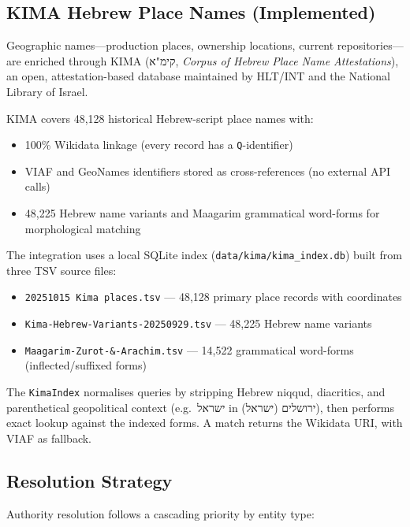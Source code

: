 \documentclass[12pt]{article}
\newcommand{\filepath}[1]{\texttt{\small #1}}
\newcommand{\code}[1]{\texttt{#1}}
\begin{document}
\subsection{KIMA Hebrew Place Names (Implemented)}

Geographic names---production places, ownership locations, current repositories---are enriched through KIMA (\texthebrew{קימ"א}, \emph{Corpus of Hebrew Place Name Attestations}), an open, attestation-based database maintained by HLT/INT and the National Library of Israel.

KIMA covers 48,128 historical Hebrew-script place names with:
\begin{itemize}
\item 100\% Wikidata linkage (every record has a \code{Q}-identifier)
\item VIAF and GeoNames identifiers stored as cross-references (no external API calls)
\item 48,225 Hebrew name variants and Maagarim grammatical word-forms for morphological matching
\end{itemize}

The integration uses a local SQLite index (\filepath{data/kima/kima\_index.db}) built from three TSV source files:
\begin{itemize}
\item \filepath{20251015 Kima places.tsv} --- 48,128 primary place records with coordinates
\item \filepath{Kima-Hebrew-Variants-20250929.tsv} --- 48,225 Hebrew name variants
\item \filepath{Maagarim-Zurot-\&-Arachim.tsv} --- 14,522 grammatical word-forms (inflected/suffixed forms)
\end{itemize}

The \code{KimaIndex} normalises queries by stripping Hebrew niqqud, diacritics, and parenthetical geopolitical context (e.g.\ \texthebrew{ישראל} in \texthebrew{ירושלים (ישראל)}), then performs exact lookup against the indexed forms. A match returns the Wikidata URI, with VIAF as fallback.

\subsection{Resolution Strategy}

Authority resolution follows a cascading priority by entity type:
\end{document}
